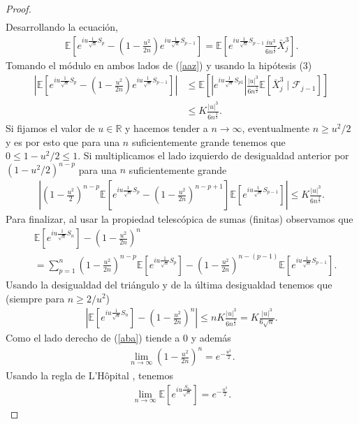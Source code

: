 \begin{proof}
\begin{align*}
	\end{align*}
Desarrollando la ecuación,
	\begin{align}
	\mathbb{E}\left[e^{iu \frac{1}{\sqrt{n}} S_p} - \left(1 - \frac{u^2}{2n}\right)e^{iu \frac{1}{\sqrt{n}} S_{p-1}}\right] = \mathbb{E}\left[e^{iu \frac{1}{\sqrt{n}} S_{p-1}} \frac{iu^3}{6n^{\frac{3}{2}}} \bar{X}_j^3 \right]. \label{aaz}
	\end{align}
Tomando el módulo en ambos lados de (\ref{aaz}) y usando la hipótesis (3)
	\begin{align*}
	\left| \mathbb{E} \left[e^{iu \frac{1}{\sqrt{n}} S_p} - \left(1 - \frac{u^2}{2n}\right) e^{iu \frac{1}{\sqrt{n}} S_{p-1}} \right]\right| & \leq \mathbb{E} \left[ | e^{iu \frac{1}{\sqrt{n}} S_{p1}} | \frac{|u|^3}{6n^{\frac{3}{2}}} \mathbb{E}[\bar{X}_j^3 \mid \mathcal{F}_{j-1}] \right] \\
	& \leq K \frac{|u|^3}{6n^{\frac{3}{2}}}.
	\end{align*} 
Si fijamos el valor de $u \in \mathbb{R}$ y hacemos tender a $n \rightarrow \infty$, eventualmente $n \geq u^2/2$ y es por esto que para una $n$ suficientemente grande tenemos que $0 \leq 1 - u^2/2 \leq 1$. Si multiplicamos el lado izquierdo de desigualdad anterior por $(1 - u^2/2)^{n-p}$ para una $n$ suficientemente grande
	\begin{align*}
	\left| \left(1 - \frac{u^2}{2}\right)^{n-p} \mathbb{E} \left[e^{iu \frac{1}{\sqrt{n}} S_p} - \left(1 - \frac{u^2}{2n}\right)^{n-p+1}\right]\mathbb{E}\left[e^{iu \frac{1}{\sqrt{n}} S_{p-1}} \right] \right| \leq K \frac{|u|^3}{6n^{\frac{3}{2}}}.
	\end{align*}
Para finalizar, al usar la propiedad telescópica de sumas (finitas) observamos que 
	\begin{align*}
	& \mathbb{E} \left[e^{iu \frac{1}{\sqrt{n}} S_n} \right] - \left(1 - \frac{u^2}{2n}\right)^{n} \\ 
	& = \sum_{p=1}^{n} \left(1 - \frac{u^2}{2n}\right)^{n-p} \mathbb{E} \left[e^{iu \frac{1}{\sqrt{n}} S_p} \right] - \left(1 - \frac{u^2}{2n}\right)^{n-(p-1)} \mathbb{E} \left[e^{iu \frac{1}{\sqrt{n}} S_{p-1}} \right].
	\end{align*}
Usando la desigualdad del triángulo y de la última desigualdad tenemos que (siempre para $n \geq 2/u^2$)
	\begin{align}
	\left| \mathbb{E} \left[e^{iu \frac{1}{\sqrt{n}} S_n} \right] - \left(1 - \frac{u^2}{2n}\right)^{n} \right| \leq n K \frac{|u|^3}{6n^{\frac{3}{2}}} = K \frac{|u|^3}{6\sqrt{n}}. \label{aba}
	\end{align}
Como el lado derecho de (\ref{aba}) tiende a $0$ y además
	\begin{align}
	\lim_{n \rightarrow \infty} \left(1 - \frac{u^2}{2n}\right)^{n} = e^{-\frac{u^2}{2}}.
	\end{align}
Usando la regla de L'Hôpital \cite[p.~215]{bartle}, tenemos
	\begin{align}
	\lim_{n \rightarrow \infty}\mathbb{E} \left[e^{iu \frac{S_n}{\sqrt{n}}} \right] = e^{-\frac{u^2}{2}}.
	\end{align}


\end{proof}

